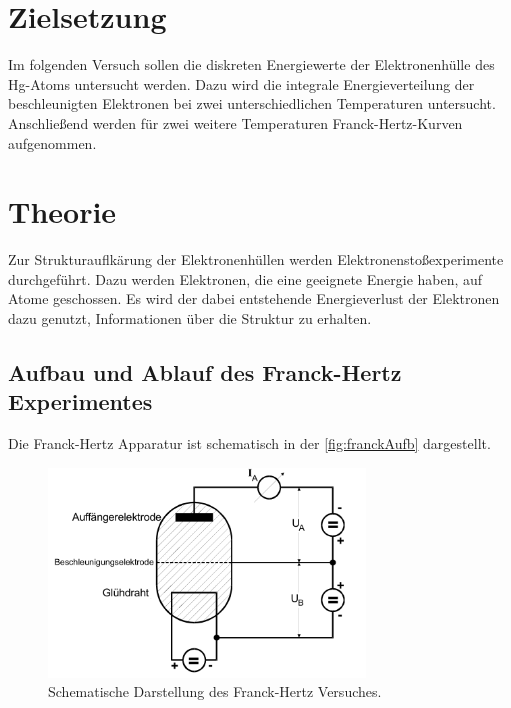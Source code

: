 \section{Zielsetzung}
\label{sec:Ziel}
Im folgenden Versuch sollen die diskreten Energiewerte der Elektronenhülle des Hg-Atoms untersucht werden. Dazu wird die integrale Energieverteilung
der beschleunigten Elektronen bei zwei unterschiedlichen Temperaturen untersucht. Anschließend werden für zwei weitere Temperaturen Franck-Hertz-Kurven aufgenommen.

\section{Theorie}
\label{sec:Theorie}

\noindent
Zur Strukturauflkärung der Elektronenhüllen werden Elektronenstoßexperimente durchgeführt. Dazu werden Elektronen, die eine geeignete Energie haben, auf Atome geschossen. Es wird
der dabei entstehende Energieverlust der Elektronen dazu genutzt, Informationen über die Struktur zu erhalten.

\subsection{Aufbau und Ablauf des Franck-Hertz Experimentes}
\label{subsec:aufbau}
Die Franck-Hertz Apparatur ist schematisch in der \autoref{fig:franckAufb} dargestellt.

\begin{figure}[H]
    \centering
    \includegraphics[width=0.75\textwidth]{data/FranckHertz.png}
    \caption{Schematische Darstellung des Franck-Hertz Versuches.}
    \label{fig:franckAufb}
\end{figure}

